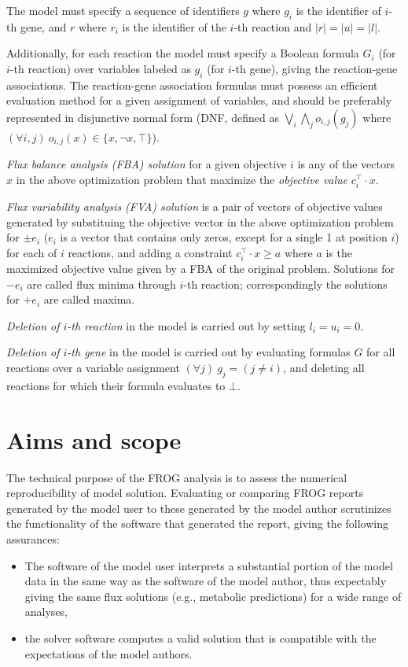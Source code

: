 The model must specify a sequence of identifiers $g$ where $g_i$ is the identifier of $i$-th gene, and $r$ where $r_i$ is the identifier of the $i$-th reaction and $|r| = |u| = |l|$.

Additionally, for each reaction the model must specify a Boolean formula $G_i$ (for $i$-th reaction) over variables labeled as $g_i$ (for $i$-th gene), giving the reaction-gene associations. The reaction-gene association formulas must possess an efficient evaluation method for a given assignment of variables, and should be preferably represented in disjunctive normal form (DNF, defined as $\bigvee_i\bigwedge_j o_{i,j}(g_j)$ where $(\forall i,j)\ o_{i,j}(x) \in \{x, \neg x, \top\}$).

\emph{Flux balance analysis (FBA) solution} for a given objective $i$ is any of the vectors $x$ in the above optimization problem that maximize the \emph{objective value} $c_i^\intercal \cdot x$.

\emph{Flux variability analysis (FVA) solution} is a pair of vectors of objective values generated by substituing the objective vector in the above optimization problem for $\pm e_i$ ($e_i$ is a vector that contains only zeros, except for a single 1 at position $i$) for each of $i$ reactions, and adding a constraint $c_i^\intercal\cdot x \geq a$ where $a$ is the maximized objective value given by a FBA of the original problem. Solutions for $-e_i$ are called flux minima through $i$-th reaction; correspondingly the solutions for $+e_i$ are called maxima.

\emph{Deletion of $i$-th reaction} in the model is carried out by setting $l_i = u_i = 0$.

\emph{Deletion of $i$-th gene} in the model is carried out by evaluating formulas $G$ for all reactions over a variable assignment $(\forall j)\ g_j = (j \neq i)$, and deleting all reactions for which their formula evaluates to $\bot$.~\cite{palsson2015systems}


\section{Aims and scope}

The technical purpose of the FROG analysis is to assess the numerical reproducibility of model solution. Evaluating or comparing FROG reports generated by the model user to these generated by the model author scrutinizes the functionality of the software that generated the report, giving the following assurances:
\begin{itemize}
\item The software of the model user interprets a substantial portion of the model data in the same way as the software of the model author, thus expectably giving the same flux solutions (e.g., metabolic predictions) for a wide range of analyses,
\item the solver software computes a valid solution that is compatible with the expectations of the model authors.
\end{itemize}

